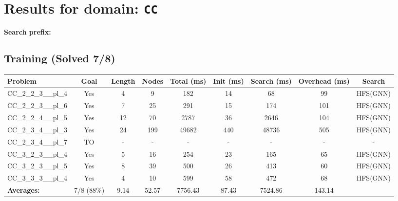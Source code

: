 \documentclass{article}
\begin{document}
\section*{Results for domain: \texttt{CC}}
\textbf{Search prefix:} 
\\[0.5cm]
\subsection*{Training (Solved 7/8)}
\begin{tabular}{lcccccccc}
\toprule
Problem & Goal & Length & Nodes & Total (ms) & Init (ms) & Search (ms) & Overhead (ms) & Search \\
\midrule
CC\_2\_2\_3\_\_pl\_4 & Yes & 4 & 9 & 182 & 14 & 68 & 99 & HFS(GNN) \\
CC\_2\_2\_3\_\_pl\_6 & Yes & 7 & 25 & 291 & 15 & 174 & 101 & HFS(GNN) \\
CC\_2\_2\_4\_\_pl\_5 & Yes & 12 & 70 & 2787 & 36 & 2646 & 104 & HFS(GNN) \\
CC\_2\_3\_4\_\_pl\_3 & Yes & 24 & 199 & 49682 & 440 & 48736 & 505 & HFS(GNN) \\
CC\_2\_3\_4\_\_pl\_7 & TO & - & - & - & - & - & - & - \\
CC\_3\_2\_3\_\_pl\_4 & Yes & 5 & 16 & 254 & 23 & 165 & 65 & HFS(GNN) \\
CC\_3\_2\_3\_\_pl\_5 & Yes & 8 & 39 & 500 & 26 & 413 & 60 & HFS(GNN) \\
CC\_3\_3\_3\_\_pl\_4 & Yes & 4 & 10 & 599 & 58 & 472 & 68 & HFS(GNN) \\
\textbf{Averages:} & 7/8 (88\%) & 9.14 & 52.57 & 7756.43 & 87.43 & 7524.86 & 143.14 & \\
\bottomrule
\end{tabular}
\\[0.7cm]
\end{document}
